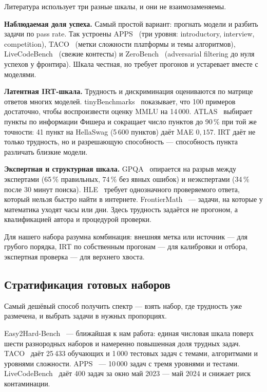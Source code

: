\documentclass[11pt,a4paper]{article}
\begin{document}
Литература использует три разные шкалы, и они не взаимозаменяемы.

\textbf{Наблюдаемая доля успеха.} Самый простой вариант: прогнать модели и
разбить задачи по pass rate. Так устроены APPS~\cite{apps2021} (три уровня:
introductory, interview, competition), TACO~\cite{taco2023} (метки
сложности платформы и темы алгоритмов), LiveCodeBench~\cite{livecodebench2024}
(свежие контесты) и ZeroBench~\cite{zerobench2025} (adversarial filtering до
нуля успехов у фронтира). Шкала честная, но требует прогонов и устаревает
вместе с моделями.

\textbf{Латентная IRT-шкала.} Трудность и дискриминация оцениваются по
матрице ответов многих моделей. tinyBenchmarks~\cite{tinybenchmarks2024}
показывает, что 100 примеров достаточно, чтобы воспроизвести оценку MMLU на
14\,000. ATLAS~\cite{atlas2025} выбирает пункты по информации Фишера и
сокращает число пунктов до 90\,\% при той же точности: 41 пункт на HellaSwag
(5\,600 пунктов) даёт MAE $0{,}157$. IRT даёт не только трудность, но и
разрешающую способность — способность пункта различать близкие модели.

\textbf{Экспертная и структурная шкала.} GPQA~\cite{gpqa2023} опирается на
разрыв между экспертами (65\,\% правильных, 74\,\% без явных ошибок) и
неэкспертами (34\,\% после 30 минут поиска). HLE~\cite{hle2025} требует
однозначного проверяемого ответа, который нельзя быстро найти в интернете.
FrontierMath~\cite{frontiermath2024} — задачи, на которые у математика уходят
часы или дни. Здесь трудность задаётся не прогоном, а квалификацией
автора и процедурой проверки.

Для нашего набора разумна комбинация: внешняя метка или источник — для
грубого порядка, IRT по собственным прогонам — для калибровки и отбора,
экспертная проверка — для верхнего хвоста.

\subsection{Стратификация готовых наборов}

Самый дешёвый способ получить спектр — взять набор, где трудность уже
размечена, и выбрать задачи в нужных пропорциях.

Easy2Hard-Bench~\cite{easy2hard2024} — ближайшая к нам работа: единая
числовая шкала поверх шести разнородных наборов и намеренно повышенная доля
трудных задач. TACO~\cite{taco2023} даёт 25\,433 обучающих и 1\,000 тестовых
задач с темами, алгоритмами и уровнями сложности. APPS~\cite{apps2021} —
10\,000 задач с тремя уровнями и тестами. LiveCodeBench~\cite{livecodebench2024}
даёт 400 задач за окно май 2023 — май 2024 и снижает риск контаминации.
\end{document}
